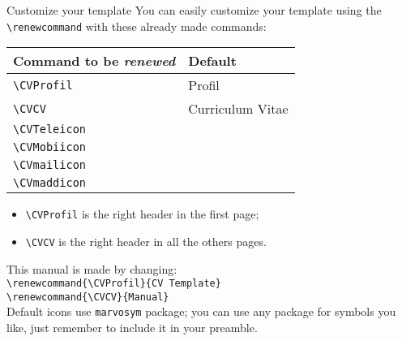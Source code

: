 \documentclass[english]{michael-cv}
\begin{document}
\begin{para}{Customize your template}
You can easily customize your template using the \verb+\renewcommand+ with these already made commands:\\[1ex]
\begin{tabular}{ll}
\toprule
Command to be \emph{renewed}	& Default		\\
\midrule
\verb+\CVProfil+		& Profil		\\
\verb+\CVCV+			& Curriculum Vitae	\\
\verb+\CVTeleicon+		& \Telefon		\\
\verb+\CVMobiicon+		& \Mobilefone		\\
\verb+\CVmailicon+		& \MVAt			\\
\verb+\CVmaddicon+		& \MVAt			\\
\bottomrule
\end{tabular}

\vspace{1ex}
\begin{itemize}
\item \verb+\CVProfil+ is the right header in the first page;
\item \verb+\CVCV+ is the right header in all the others pages.
\end{itemize}

This manual is made by changing:\\
\null\hspace{4ex}\verb+\renewcommand{\CVProfil}{CV Template}+\\[-2ex]
\null\hspace{4ex}\verb+\renewcommand{\CVCV}{Manual}+\\[1ex]

Default icons use \texttt{marvosym} package; you can use any package for symbols you like, just remember to include it in your preamble.
\end{para}
\end{document}

